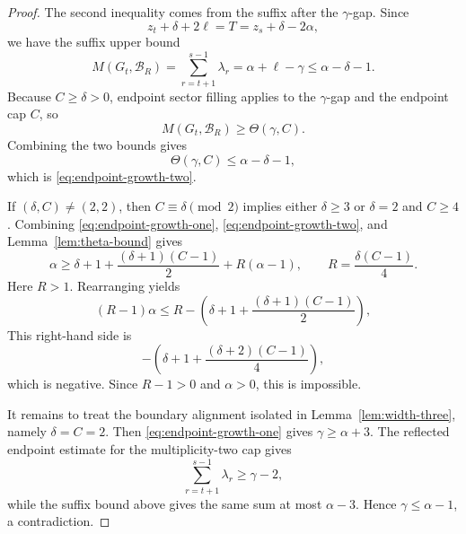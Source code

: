\documentclass[10pt,a4paper]{amsart}
\begin{document}
\begin{proof}
The second inequality comes from the suffix after the $\gamma$-gap.  Since
\[
        z_t+\delta+2\ell=T=z_s+\delta-2\alpha,
\]
we have the suffix upper bound
\[
        M(G_t,\mathcal B_R)=\sum_{r=t+1}^{s-1}\lambda_r=\alpha+\ell-\gamma\le \alpha-\delta-1.
\]
Because $C\ge\delta>0$, endpoint sector filling applies to the $\gamma$-gap and the endpoint cap $C$, so
\[
        M(G_t,\mathcal B_R)\ge\Theta(\gamma,C).
\]
Combining the two bounds gives
\[
        \Theta(\gamma,C)\le \alpha-\delta-1,
\]
which is \eqref{eq:endpoint-growth-two}.

If $(\delta,C)\ne(2,2)$, then $C\equiv\delta\pmod2$ implies either $\delta\ge3$ or $\delta=2$ and $C\ge4$.  Combining \eqref{eq:endpoint-growth-one}, \eqref{eq:endpoint-growth-two}, and Lemma~\ref{lem:theta-bound} gives
\[
        \alpha\ge
        \delta+1+
        \frac{(\delta+1)(C-1)}2
        +R(\alpha-1),
        \qquad
        R=\frac{\delta(C-1)}4.
\]
Here $R>1$.  Rearranging yields
\[
        (R-1)\alpha
        \le
        R-
        \left(\delta+1+\frac{(\delta+1)(C-1)}2\right),
\]
This right-hand side is
\[
        -\left(\delta+1+\frac{(\delta+2)(C-1)}4\right),
\]
which is negative.  Since $R-1>0$ and $\alpha>0$, this is impossible.

It remains to treat the boundary alignment isolated in Lemma~\ref{lem:width-three}, namely $\delta=C=2$.  Then \eqref{eq:endpoint-growth-one} gives $\gamma\ge\alpha+3$.  The reflected endpoint estimate for the multiplicity-two cap gives
\[
        \sum_{r=t+1}^{s-1}\lambda_r\ge \gamma-2,
\]
while the suffix bound above gives the same sum at most $\alpha-3$.  Hence $\gamma\le\alpha-1$, a contradiction.
\end{proof}
\end{document}
